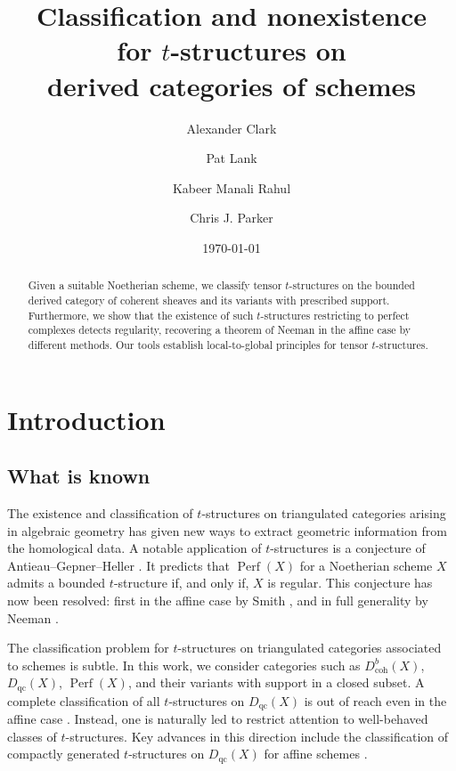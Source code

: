 \documentclass[11pt]{amsart}
\title[Classification, nonexistence, tensor $t$-structures]{Classification and nonexistence \\ for $t$-structures on \\ derived categories of schemes}
\author[A. ~Clark]{Alexander Clark}
\author[P.~Lank]{Pat Lank}
\author[K. ~Manali Rahul]{Kabeer Manali Rahul}
\author[C. ~J. Parker]{Chris J. Parker}
\date{\today}
\theoremstyle{plain}
\theoremstyle{definition}
\numberwithin{equation}{section}
\numberwithin{theorem}{section}
\begin{document}
    
\begin{abstract}
    Given a suitable Noetherian scheme, we classify tensor $t$-structures on the bounded derived category of coherent sheaves and its variants with prescribed support. Furthermore, we show that the existence of such $t$-structures restricting to perfect complexes detects regularity, recovering a theorem of Neeman in the affine case by different methods. Our tools establish local-to-global principles for tensor $t$-structures.
\end{abstract}

\maketitle

\section{Introduction}
\label{sec:introduction}

\subsection{What is known}
\label{sec:introduction_known}

The existence and classification of $t$-structures on triangulated categories arising in algebraic geometry has given new ways to extract geometric information from the homological data. A notable application of $t$-structures is a conjecture of Antieau--Gepner--Heller \cite{Antieau/Gepner/Heller:2019}. It predicts that $\operatorname{Perf}(X)$ for a Noetherian scheme $X$ admits a bounded $t$-structure if, and only if, $X$ is regular. This conjecture has now been resolved: first in the affine case by Smith \cite{Smith:2022}, and in full generality by Neeman \cite{Neeman:2022}.

The classification problem for $t$-structures on triangulated categories associated to schemes is subtle. In this work, we consider categories such as $D^b_{\operatorname{coh}}(X)$, $D_{\operatorname{qc}}(X)$, $\operatorname{Perf}(X)$, and their variants with support in a closed subset. A complete classification of all $t$-structures on $D_{\operatorname{qc}}(X)$ is out of reach even in the affine case \cite{Stanley:2010}. Instead, one is naturally led to restrict attention to well-behaved classes of $t$-structures. Key advances in this direction include the classification of compactly generated $t$-structures on $D_{\operatorname{qc}}(X)$ for affine schemes \cite{AlonsoTarrio/JeremiasLopez/Saorin:2010, Hrbek:2020}. 
\end{document}
